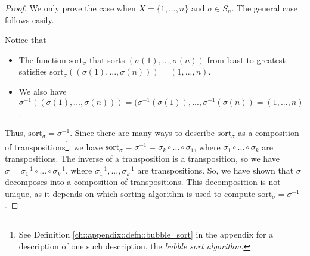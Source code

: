 \begin{proof}
    We only prove the case when $X = \{1, ..., n\}$ and $\sigma \in S_n$. The general case follows easily.
    
    Notice that
    
    \begin{itemize}
        \item The function $\text{sort}_\sigma$ that sorts $(\sigma(1), ..., \sigma(n))$ from least to greatest satisfies $\text{sort}_\sigma((\sigma(1), ..., \sigma(n))) = (1, ..., n)$.
        \item We also have $\sigma^{-1}((\sigma(1), ..., \sigma(n))) = (\sigma^{-1}(\sigma(1)), ..., \sigma^{-1}(\sigma(n)) = (1, ..., n)$.
    \end{itemize} 
    
    Thus, $\text{sort}_\sigma = \sigma^{-1}$. Since there are many ways to describe $\text{sort}_\sigma$ as a composition of transpositions\footnote{See Definition \ref{ch::appendix::defn::bubble_sort} in the appendix for a description of one such description, the \textit{bubble sort algorithm}.}, we have $\text{sort}_\sigma = \sigma^{-1} = \sigma_k \circ ... \circ \sigma_1$, where $\sigma_1 \circ ... \circ \sigma_k$ are transpositions. The inverse of a transposition is a transposition, so we have $\sigma = \sigma_1^{-1} \circ ... \circ \sigma_k^{-1}$, where $\sigma_1^{-1}, ..., \sigma_k^{-1}$ are transpositions. So, we have shown that $\sigma$ decomposes into a composition of transpositions. This decomposition is not unique, as it depends on which sorting algorithm is used to compute $\text{sort}_\sigma = \sigma^{-1}$.
    
\end{proof}

